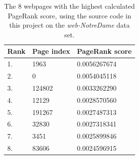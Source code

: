 \documentclass[10pt, a4paper]{amsart}
\numberwithin{figure}{section}
\numberwithin{table}{section}
\begin{document}
\begin{table}[H]
    \caption{The 8 webpages with the highest calculated PageRank score, using the source code in this project on the \textit{web-NotreDame} data set.}
    \label{tab:notredame_results}
    \begin{tabular}{lll}
        Rank & Page index & PageRank score \\
        \hline
        1. & 1963 & 0.0056267674\\
        2. & 0 & 0.0054045118\\
        3. & 124802 & 0.0033262290\\
        4. & 12129 & 0.0028570560\\
        5. & 191267 & 0.0027487313\\
        6. & 32830 & 0.0027318341\\
        7. & 3451 & 0.0025899846\\
        8. & 83606 & 0.0024596915\\
    \end{tabular}
\end{table}





\end{document}
